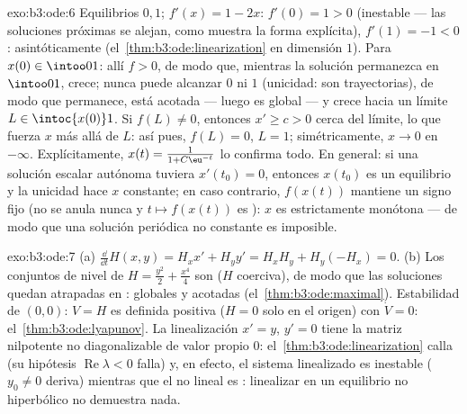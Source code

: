 \begin{solution}{exo:b3:ode:6}
Equilibrios $0, 1$; $f'(x) = 1 - 2x$: $f'(0) = 1 > 0$ (inestable --- las
soluciones próximas se alejan, como muestra la forma explícita),
$f'(1) = -1 < 0$: asintóticamente 
(el~\cref{thm:b3:ode:linearization} en dimensión $1$). Para
$x(0) \in \intoo01$: allí $f > 0$, de modo que, mientras la solución
permanezca en $\intoo01$, crece; nunca puede alcanzar $0$ ni $1$
(unicidad: son trayectorias), de modo que permanece, está acotada ---
luego es global --- y crece hacia un límite $L
\in \intoc{x(0)}1$. Si $f(L) \neq 0$, entonces $x' \geq c > 0$ cerca del
límite, lo que fuerza $x$ más allá de $L$: así pues, $f(L) = 0$,
$L = 1$; simétricamente, $x \to 0$ en $-\infty$. Explícitamente, $x(t) =
\frac1{1 + C\eu^{-t}}$ lo confirma todo. En general: si una solución
escalar autónoma tuviera $x'(t_0) = 0$, entonces $x(t_0)$ es un
equilibrio y la unicidad hace $x$ constante; en caso contrario,
$f(x(t))$ mantiene un signo fijo (no se anula nunca y
$t \mapsto f(x(t))$ es ):
$x$ es estrictamente monótona --- de modo que una solución periódica no
constante es imposible.
\end{solution}

\begin{solution}{exo:b3:ode:7}
(a) $\frac{\dd}{\dd t}H(x,y) = H_xx' + H_yy' = H_xH_y +
H_y(-H_x) = 0$.
(b) Los conjuntos de nivel de $H = \frac{y^2}2 + \frac{x^4}4$ son
 ($H$ coerciva), de modo que
las soluciones quedan atrapadas en
: globales y acotadas
(el~\cref{thm:b3:ode:maximal}). Estabilidad de $(0,0)$: $V = H$ es
definida positiva ($H = 0$ solo en el origen) con $\dot V = 0$:
el~\cref{thm:b3:ode:lyapunov}. La linealización $x' = y$, $y' = 0$ tiene
la matriz nilpotente no diagonalizable de valor propio $0$:
el~\cref{thm:b3:ode:linearization} calla (su hipótesis
$\operatorname{Re}\lambda < 0$ falla) y, en efecto, el sistema
linealizado es inestable ($y_0 \ne 0$ deriva) mientras que el no lineal
es : linealizar en un equilibrio
no hiperbólico no demuestra nada.
\end{solution}

